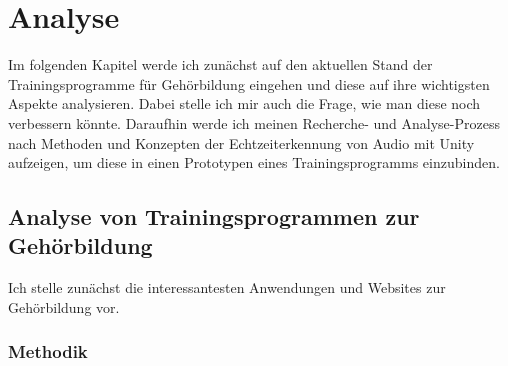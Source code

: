 \chapter{Analyse}

%
%
Im folgenden Kapitel werde ich zunächst auf den aktuellen Stand der Trainingsprogramme für Gehörbildung eingehen und diese auf ihre wichtigsten Aspekte analysieren. Dabei stelle ich mir auch die Frage, wie man diese noch verbessern könnte. Daraufhin werde ich meinen Recherche- und Analyse-Prozess nach Methoden und Konzepten der Echtzeiterkennung von Audio mit Unity aufzeigen, um diese in einen Prototypen eines Trainingsprogramms einzubinden.

\section{Analyse von Trainingsprogrammen zur Gehörbildung}
Ich stelle zunächst die interessantesten Anwendungen und Websites zur Gehörbildung vor.
\subsection{Methodik}
%

